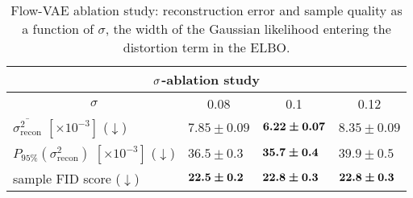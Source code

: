 \documentclass[10pt]{article} \usepackage[accepted]{tmlr}
\def\bi#1{\hbox{\boldmath{$#1$}}}
\begin{document}
\begin{table}[h]
\begin{center}
\begin{tabular}{llll}
\multicolumn{4}{c}{$\bf{\sigma}$-\textbf{ablation study}}                                                                                   \\ \hline
\multicolumn{1}{c|}{$\sigma$}   & \multicolumn{1}{c|}{0.08} & \multicolumn{1}{c|}{0.1}         & \multicolumn{1}{c}{0.12} \\ \hline
\multicolumn{1}{l|}{$\overline{\sigma_\mathrm{recon}^2}$ $[\times10^{-3}]$ ($\downarrow$)} & \multicolumn{1}{l|}{$7.85\pm0.09$}    & \multicolumn{1}{l|}{$\bi{6.22\pm0.07}$}    & \multicolumn{1}{l}{$8.35\pm0.09$}  \\
\multicolumn{1}{l|}{$P_{95\%}(\sigma_{\mathrm{recon}}^2)$ $[\times10^{-3}]$ ($\downarrow$)} & \multicolumn{1}{l|}{$36.5\pm0.3$}       &  \multicolumn{1}{l|}{$\bi{35.7 \pm 0.4}$}  & \multicolumn{1}{l}{$39.9\pm 0.5$}\\
\multicolumn{1}{l|}{sample FID score ($\downarrow$)} & \multicolumn{1}{l|}{$\bi{22.5\pm0.2}$}       &  \multicolumn{1}{l|}{$\bi{22.8 \pm 0.3}$} & \multicolumn{1}{l}{$\bi{22.8\pm0.3}$} \\
\end{tabular}
\end{center}
\caption{\label{tab:flow-ab}Flow-VAE ablation study: reconstruction error and sample quality as a function of $\sigma$, the width of the Gaussian likelihood entering the distortion term in the ELBO.}
\end{table}
\end{document}
